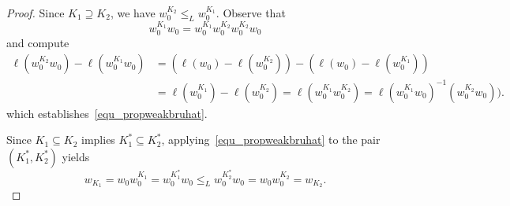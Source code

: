 \documentclass[10pt,a4paper]{amsart}
\begin{document}
\begin{proof}
Since $K_1 \supseteq K_2$, we have $w_{0}^{K_2} \leq_L w_{0}^{K_1}$. Observe that
$$
w^{{K_1}}_0 w_0 = w^{{K_1}}_0 w^{{K_2}}_0 w^{{K_2}}_0 w_0
$$
and compute
\begin{align*}
\ell ( w^{K_2}_{0} w_0 ) - \ell ( w^{K_1}_{0} w_0) &= \left( \ell(w_0) - \ell (w^{K_2}_{0}) \right) - \left( \ell(w_0) - \ell (w^{K_1}_{0}) \right) \\
&= \ell (w^{K_1}_{0}) - \ell (w^{K_2}_{0}) = \ell (w^{K_1}_{0} w^{K_2}_{0}) = \ell( w^{{K_1}}_0 w_0)^{-1} (w^{{K_2}}_0 w_0)).
\end{align*}
which establishes~\eqref{equ_propweakbruhat}. 

Since $K_1 \subseteq K_2$ implies $K_1^* \subseteq K_2^*$, applying~\eqref{equ_propweakbruhat} to the pair $(K_1^*, K_2^*)$ yields 
$$
w_{K_1} = w_0w_0^{K_1} = w_0^{K_1^*} w_0 \leq_L w_0^{K_2^*} w_0 = w_0 w_0^{K_2} = w_{K_2}.
$$
\end{proof}
\end{document}
